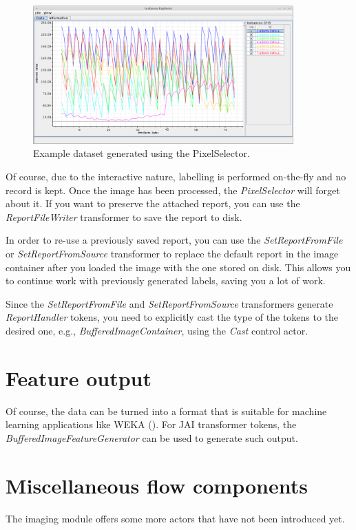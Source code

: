 \documentclass[a4paper]{book}
\begin{document}
\begin{figure}[htb]
  \centering
  \includegraphics[width=10.0cm]{images/pixelselector-dataset.png}
  \caption{Example dataset generated using the PixelSelector.}
  \label{pixelselector-dataset}
\end{figure}

Of course, due to the interactive nature, labelling is performed on-the-fly and
no record is kept. Once the image has been processed, the
\textit{PixelSelector} will forget about it. If you want to preserve the
attached report, you can use the \textit{ReportFileWriter} transformer to save
the report to disk. 

In order to re-use a previously saved report, you can use the
\textit{SetReportFromFile} or \textit{SetReportFromSource} transformer to
replace the default report in the image container after you loaded the image
with the one stored on disk. This allows you to continue work with previously
generated labels, saving you a lot of work.

Since the \textit{SetReportFromFile} and \textit{SetReportFromSource}
transformers generate \textit{ReportHandler} tokens, you need to explicitly
cast the type of the tokens to the desired one, e.g.,
\textit{BufferedImageContainer}, using the \textit{Cast} control actor.

\chapter{Feature output}
Of course, the data can be turned into a format that is suitable for machine 
learning applications like WEKA (\cite{weka}). For JAI transformer tokens, the
\textit{BufferedImageFeatureGenerator} can be used to generate such output.

\chapter{Miscellaneous flow components}
The imaging module offers some more actors that have not been introduced yet.
\end{document}
